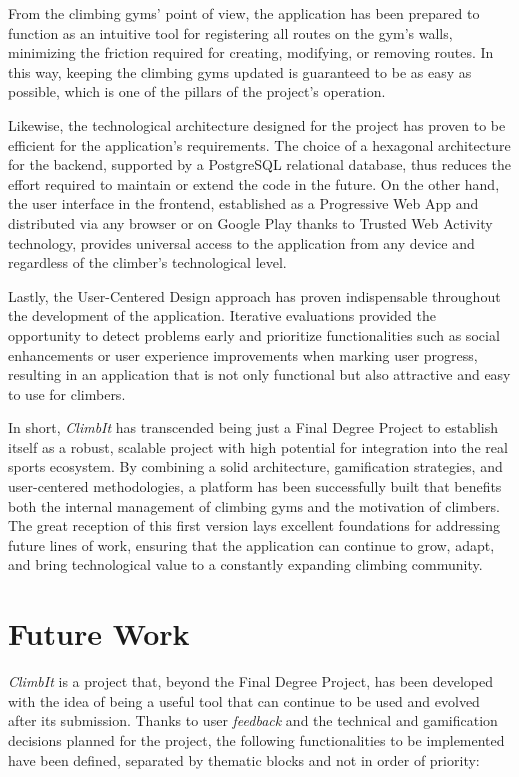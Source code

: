 From the climbing gyms' point of view, the application has been prepared to function as an intuitive tool for registering all routes on the gym's walls, minimizing the friction required for creating, modifying, or removing routes. In this way, keeping the climbing gyms updated is guaranteed to be as easy as possible, which is one of the pillars of the project's operation. 

Likewise, the technological architecture designed for the project has proven to be efficient for the application's requirements. The choice of a hexagonal architecture for the backend, supported by a PostgreSQL relational database, thus reduces the effort required to maintain or extend the code in the future. On the other hand, the user interface in the frontend, established as a Progressive Web App and distributed via any browser or on Google Play thanks to Trusted Web Activity technology, provides universal access to the application from any device and regardless of the climber's technological level. 

Lastly, the User-Centered Design approach has proven indispensable throughout the development of the application. Iterative evaluations provided the opportunity to detect problems early and prioritize functionalities such as social enhancements or user experience improvements when marking user progress, resulting in an application that is not only functional but also attractive and easy to use for climbers. 

In short, \textit{ClimbIt} has transcended being just a Final Degree Project to establish itself as a robust, scalable project with high potential for integration into the real sports ecosystem. By combining a solid architecture, gamification strategies, and user-centered methodologies, a platform has been successfully built that benefits both the internal management of climbing gyms and the motivation of climbers. The great reception of this first version lays excellent foundations for addressing future lines of work, ensuring that the application can continue to grow, adapt, and bring technological value to a constantly expanding climbing community. 

\section{Future Work} 

\textit{ClimbIt} is a project that, beyond the Final Degree Project, has been developed with the idea of being a useful tool that can continue to be used and evolved after its submission. Thanks to user \textit{feedback} and the technical and gamification decisions planned for the project, the following functionalities to be implemented have been defined, separated by thematic blocks and not in order of priority: 

